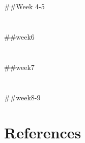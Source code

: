 \documentclass[
  letterpaper,
  DIV=11,
  numbers=noendperiod]{scrreprt}
\begin{document}
\chapter{}\label{section-3}

\#\#Week 4-5


\chapter{}\label{section-4}

\#\#week6


\chapter{}\label{section-5}

\#\#week7


\chapter{}\label{section-6}

\#\#week8-9


\chapter*{References}\label{references}


\label{refs}
\end{document}
